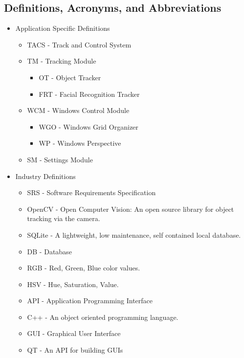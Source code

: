 \documentclass[titlepage]{article}
\begin{document}
\subsection{Definitions, Acronyms, and Abbreviations}
\begin{itemize}
	\item Application Specific Definitions
	\begin{itemize}
		\item TACS - Track and Control System
		\item TM - Tracking Module
		\begin{itemize}
			\item OT - Object Tracker
			\item FRT - Facial Recognition Tracker
		\end{itemize}
		\item WCM - Windows Control Module
		\begin{itemize}
			\item WGO - Windows Grid Organizer
			\item WP - Windows Perspective
		\end{itemize}
		\item SM - Settings Module
	\end{itemize}
	\item Industry Definitions
	\begin{itemize}
		\item SRS - Software Requirements Specification
		\item OpenCV - Open Computer Vision: An open source library for object tracking via the camera.
		\item SQLite - A lightweight, low maintenance, self contained local database.
		\item DB - Database
		\item RGB - Red, Green, Blue color values.
		\item HSV - Hue, Saturation, Value.
		\item API - Application Programming Interface
		\item C++ - An object oriented programming language.
		\item GUI - Graphical User Interface
		\item QT - An API for building GUIs
	\end{itemize}
\end{itemize}
\end{document}
